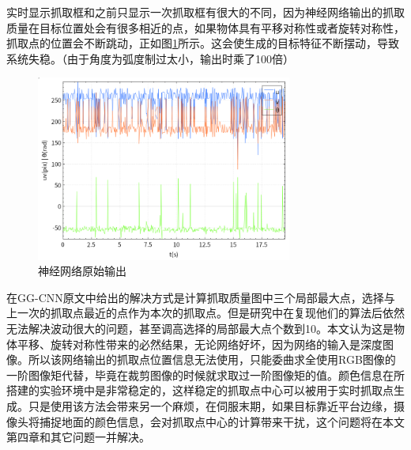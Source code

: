 \documentclass[fontset=fandol,type=bachelor,campus=harbin]{hithesisbook}
\begin{document}
实时显示抓取框和之前只显示一次抓取框有很大的不同，因为神经网络输出的抓取质量在目标位置处会有很多相近的点，如果物体具有平移对称性或者旋转对称性，抓取点的位置会不断跳动，正如图\ref{神经网络原始输出}所示。这会使生成的目标特征不断摆动，导致系统失稳。（由于角度为弧度制过太小，输出时乘了100倍）
\begin{figure}[h]
\centering
\includegraphics[width = 0.75\textwidth]{chapter3/神经网络原始输出}
\caption{神经网络原始输出}
\label{神经网络原始输出}
\end{figure}


在GG-CNN原文中给出的解决方式是计算抓取质量图中三个局部最大点，选择与上一次的抓取点最近的点作为本次的抓取点。但是研究中在复现他们的算法后依然无法解决波动很大的问题，甚至调高选择的局部最大点个数到10。本文认为这是物体平移、旋转对称性带来的必然结果，无论网络好坏，因为网络的输入是深度图像。所以该网络输出的抓取点位置信息无法使用，只能委曲求全使用RGB图像的一阶图像矩代替，毕竟在裁剪图像的时候就求取过一阶图像矩的值。颜色信息在所搭建的实验环境中是非常稳定的，这样稳定的抓取点中心可以被用于实时抓取点生成。只是使用该方法会带来另一个麻烦，在伺服末期，如果目标靠近平台边缘，摄像头将捕捉地面的颜色信息，会对抓取点中心的计算带来干扰，这个问题将在本文第四章和其它问题一并解决。
\end{document}
